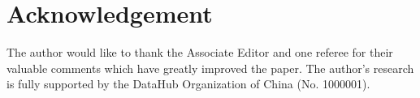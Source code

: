 \section*{Acknowledgement}
The author would like to thank the Associate Editor and one referee for their valuable comments which have greatly improved the paper. The author's research is fully supported by the DataHub Organization of China (No. 1000001).
